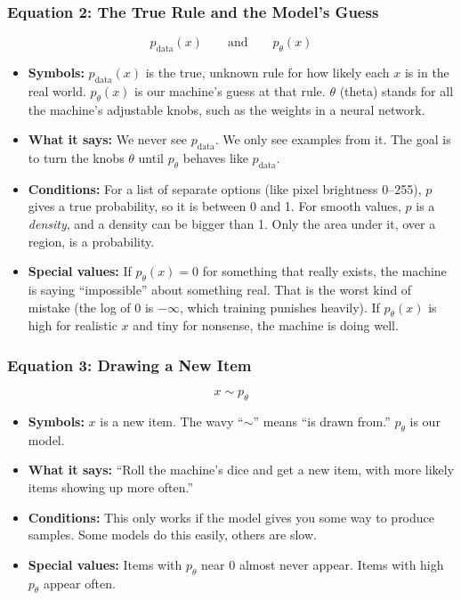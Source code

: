 \subsubsection*{Equation 2: The True Rule and the Model's Guess}

\[
p_{\text{data}}(x) \qquad \text{and} \qquad p_\theta(x)
\]

\begin{itemize}
  \item \textbf{Symbols:} $p_{\text{data}}(x)$ is the true, unknown rule for how likely each $x$ is in the real world. $p_\theta(x)$ is our machine's guess at that rule. $\theta$ (theta) stands for all the machine's adjustable knobs, such as the weights in a neural network.
  \item \textbf{What it says:} We never see $p_{\text{data}}$. We only see examples from it. The goal is to turn the knobs $\theta$ until $p_\theta$ behaves like $p_{\text{data}}$.
  \item \textbf{Conditions:} For a list of separate options (like pixel brightness 0--255), $p$ gives a true probability, so it is between 0 and 1. For smooth values, $p$ is a \textit{density}, and a density can be bigger than 1. Only the area under it, over a region, is a probability.
  \item \textbf{Special values:} If $p_\theta(x) = 0$ for something that really exists, the machine is saying ``impossible'' about something real. That is the worst kind of mistake (the log of 0 is $-\infty$, which training punishes heavily). If $p_\theta(x)$ is high for realistic $x$ and tiny for nonsense, the machine is doing well.
\end{itemize}

\subsubsection*{Equation 3: Drawing a New Item}

\[
x \sim p_\theta
\]

\begin{itemize}
  \item \textbf{Symbols:} $x$ is a new item. The wavy ``$\sim$'' means ``is drawn from.'' $p_\theta$ is our model.
  \item \textbf{What it says:} ``Roll the machine's dice and get a new item, with more likely items showing up more often.''
  \item \textbf{Conditions:} This only works if the model gives you some way to produce samples. Some models do this easily, others are slow.
  \item \textbf{Special values:} Items with $p_\theta$ near 0 almost never appear. Items with high $p_\theta$ appear often.
\end{itemize}

